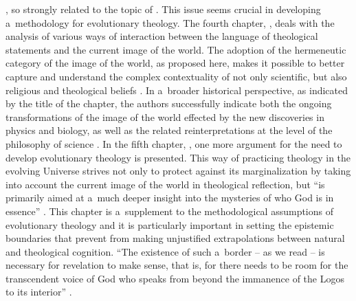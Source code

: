 \parencite*[][pp.77–84]{}, %
 so strongly related to the topic of . This issue seems crucial in developing a~methodology for evolutionary theology. The fourth chapter,  
\parencite*[][pp.85–121]{}, %
 deals with the analysis of various ways of interaction between the language of theological statements and the current image of the world. The adoption of the hermeneutic category of the image of the world, as proposed here, makes it possible to better capture and understand the complex contextuality of not only scientific, but also religious and theological beliefs 
\parencite*[][pp.86–87]{}. %
 In a~broader historical perspective, as indicated by the title of the chapter, the authors successfully indicate both the ongoing transformations of the image of the world effected by the new discoveries in physics and biology, as well as the related reinterpretations at the level of the philosophy of science 
\parencite[e.g][pp.119–120]{}. %
 In the fifth chapter,  
\parencite*[][pp.122–151]{}, %
 one more argument for the need to develop evolutionary theology is presented. This way of practicing theology in the evolving Universe strives not only to protect against its marginalization by taking into account the current image of the world in theological reflection, but ``is primarily aimed at a~much deeper insight into the mysteries of who God is in essence'' 
\parencite*[][p.122]{}. %
 This chapter is a~supplement to the methodological assumptions of evolutionary theology and it is particularly important in setting the epistemic boundaries that prevent from making unjustified extrapolations between natural and theological cognition. ``The existence of such a~border -- as we read -- is necessary for revelation to make sense, that is, for there needs to be room for the transcendent voice of God who speaks from beyond the immanence of the Logos to its interior'' 
\parencite*[][p.146]{}.%




